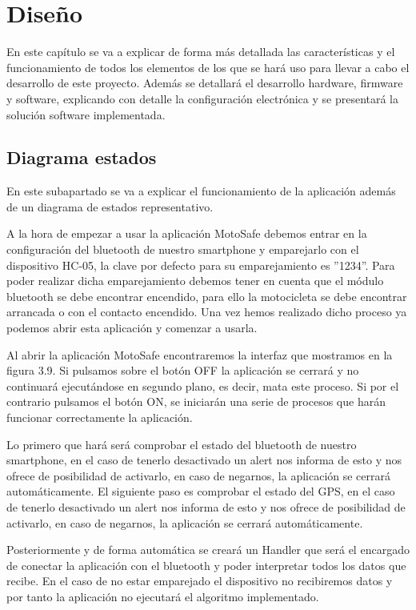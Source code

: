 	\chapter{Dise\~no}\label{cap.desarrollo}
	
	En este cap\'itulo se va a explicar de forma m\'as detallada las caracter\'isticas y el funcionamiento de todos los elementos de los que se har\'a uso para llevar a cabo el desarrollo de este proyecto. Adem\'as se detallar\'a el desarrollo hardware, firmware y software, explicando con detalle la configuraci\'on electr\'onica y se presentar\'a la soluci\'on software implementada.
	
	\section{Diagrama estados}
	
	En este subapartado se va a explicar el funcionamiento de la aplicaci\'on adem\'as de un diagrama de estados representativo.
	
	A la hora de empezar a usar la aplicaci\'on MotoSafe debemos entrar en la configuraci\'on del bluetooth de nuestro smartphone y emparejarlo con el dispositivo HC-05, la clave por defecto para su emparejamiento es ''1234''. Para poder realizar dicha emparejamiento debemos tener en cuenta que el m\'odulo bluetooth se debe encontrar encendido, para ello la motocicleta se debe encontrar arrancada o con el contacto encendido. Una vez hemos realizado dicho proceso ya podemos abrir esta aplicaci\'on y comenzar a usarla.
	
	Al abrir la aplicaci\'on MotoSafe encontraremos la interfaz que mostramos en la figura 3.9. Si pulsamos sobre el bot\'on OFF la aplicaci\'on se cerrar\'a y no continuar\'a ejecut\'andose en segundo plano, es decir, mata este proceso. Si por el contrario pulsamos el bot\'on ON, se iniciar\'an una serie de procesos que har\'an funcionar correctamente la aplicaci\'on.
	
	Lo primero que har\'a ser\'a comprobar el estado del bluetooth de nuestro smartphone, en el caso de tenerlo desactivado un alert nos informa de esto y nos ofrece de posibilidad de activarlo, en caso de negarnos, la aplicaci\'on se cerrar\'a autom\'aticamente. El siguiente paso es comprobar el estado del GPS, en el caso de tenerlo desactivado un alert nos informa de esto y nos ofrece de posibilidad de activarlo, en caso de negarnos, la aplicaci\'on se cerrar\'a autom\'aticamente.
	
	Posteriormente y de forma autom\'atica se crear\'a un Handler que ser\'a el encargado de conectar la aplicaci\'on con el bluetooth y poder interpretar todos los datos que recibe. En el caso de no estar emparejado el dispositivo no recibiremos datos y por tanto la aplicaci\'on no ejecutar\'a el algoritmo implementado.
	

